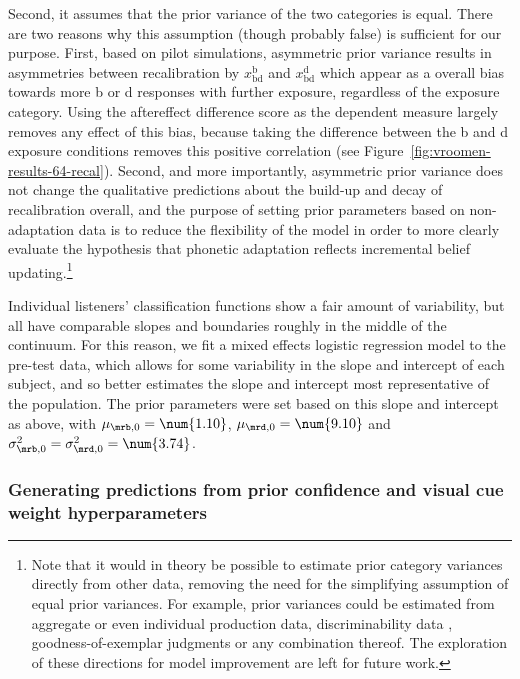 Second, it assumes that the prior variance of the two categories is equal.
There are two reasons why this assumption (though probably false) is sufficient for our purpose.
First, based on pilot simulations, asymmetric prior variance results in asymmetries between recalibration by $x_\mathrm{bd}^\mathrm{b}$ and $x_\mathrm{bd}^\mathrm{d}$ which appear as a overall bias towards more \ph b or \ph d responses with further exposure, regardless of the exposure category.  Using the aftereffect difference score as the dependent measure largely removes any effect of this bias, because taking the difference between the \ph b and \ph d exposure conditions removes this positive correlation (see Figure~\ref{fig:vroomen-results-64-recal}).  Second, and more importantly, asymmetric prior variance does not change the qualitative predictions about the build-up and decay of recalibration overall, and the purpose of setting prior parameters based on non-adaptation data is to reduce the flexibility of the model in order to more clearly evaluate the hypothesis that phonetic adaptation reflects incremental belief updating.\footnote{Note that it would in theory be possible to estimate prior category variances directly from other data, removing the need for the simplifying assumption of equal prior variances. For example, prior variances could be estimated from aggregate or even individual production data, discriminability data \autocite{Kronrod2012}, goodness-of-exemplar judgments \autocite{Pisoni1974,Andruski1994} or any combination thereof. The exploration of these directions for model improvement are left for future work.}

Individual listeners' classification functions show a fair amount of variability, but all have comparable slopes and boundaries roughly in the middle of the continuum.  For this reason, we fit a mixed effects logistic regression model \autocite{Jaeger2008} to the pre-test data, which allows for some variability in the slope and intercept of each subject, and so better estimates the slope and intercept most representative of the population.  The prior parameters were set based on this slope and intercept as above, with $\mu_{\mrb,0}=\num{1.10}$, $\mu_{\mrd,0}=\num{9.10}$ and $\sigma^2_{\mrb,0}=\sigma^2_{\mrd,0} = \num{3.74}$.

\subsubsection{Generating predictions from prior confidence and visual cue weight hyperparameters}
\label{sec:prior-conf-pseud}

